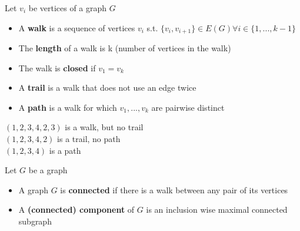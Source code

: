 \begin{definition}
Let $v_i$ be vertices of a graph $G$
    \begin{itemize}
        \item A \textbf{walk} is a sequence of vertices $v_i$ s.t. $\{v_i,v_{i+1}\}\in E(G) \forall i\in \{1,...,k-1\}$
        \item The \textbf{length} of a walk is k (number of vertices in the walk)
        \item The walk is \textbf{closed} if $v_1=v_k$
        \item A \textbf{trail} is a walk that does not use an edge twice
        \item A \textbf{path} is a walk for which $v_1,...,v_k$ are pairwise distinct
    \end{itemize}
    \begin{center}
        \end{center}
        $(1,2,3,4,2,3)$ is a walk, but no trail \\
        $(1,2,3,4,2)$ is a trail, no path \\
        $(1,2,3,4)$ is a path
\end{definition}

\vspace{0.5cm}

\begin{definition} 
Let $G$ be a graph
    \begin{itemize}
        \item A graph $G$ is \textbf{connected} if there is a walk between any pair of its vertices
        \item A \textbf{(connected) component} of $G$ is an inclusion wise maximal connected subgraph
    \end{itemize}
\end{definition}




